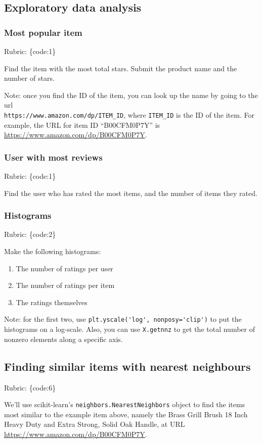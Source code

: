 \documentclass{article}
\def\rubric#1{\gre{Rubric: \{#1\}}}{}
\def\blu#1{{\color{blu}#1}}
\def\gre#1{{\color{gre}#1}}
\begin{document}
\subsection{Exploratory data analysis}

\subsubsection{Most popular item}
\rubric{code:1}

Find the item with the most total stars. \blu{Submit the product name and the number of stars}.

Note: once you find the ID of the item, you can look up the name by going to the url \\ \verb|https://www.amazon.com/dp/ITEM_ID|, where \verb|ITEM_ID| is the ID of the item.
For example, the URL for item ID ``B00CFM0P7Y'' is \url{https://www.amazon.com/dp/B00CFM0P7Y}. 


\subsubsection{User with most reviews}
\rubric{code:1}

\blu{Find the user who has rated the most items, and the number of items they rated.}


\subsubsection{Histograms}
\rubric{code:2}

\blu{Make the following histograms:}
\begin{enumerate}
\item The number of ratings per user
\item The number of ratings per item
\item The ratings themselves
\end{enumerate}

Note: for the first two, use \verb|plt.yscale('log', nonposy='clip')| to put the histograms on a log-scale. Also, you can use \verb|X.getnnz| to get the total number of nonzero elements along a specific axis.

\subsection{Finding similar items with nearest neighbours}
\rubric{code:6}

We'll use scikit-learn's \texttt{neighbors.NearestNeighbors} object to find the items most similar to the example item above, namely the Brass Grill Brush 18 Inch Heavy Duty and Extra Strong, Solid Oak Handle, at URL \url{https://www.amazon.com/dp/B00CFM0P7Y}.
\end{document}
